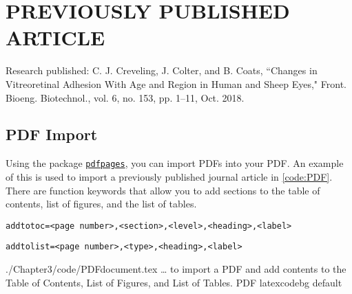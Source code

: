 \documentclass[../Dissertation]{subfiles}
\begin{document}
    \chapter[\uppercase{Previously published article}]{\uppercase{Previously
    published article}}\label{chp:3}
    
    
    Research published:  C. J. Creveling, J. Colter, and B. Coats, ``Changes in
    Vitreoretinal Adhesion With Age and Region in Human and Sheep Eyes," Front.
    Bioeng. Biotechnol., vol. 6, no. 153, pp. 1–11, Oct. 2018.
    
    
    
    \section{PDF Import}
        Using the  package
        \href{https://ctan.org/pkg/pdfpages?lang=en}{\texttt{pdfpages}}, you
        can import PDFs into your PDF.  An example of this is used to import a
        previously published journal article in \cref{code:PDF}.  There are
        function keywords that allow you to add sections to the table of
        contents, list of figures, and the list of tables.  
        
        \texttt{addtotoc={<page number>,<section>,<level>,<heading>,<label>}}
        
        \texttt{addtolist={<page number>,<type>,<heading>,<label>}}

        {./Chapter3/code/PDFdocument.tex} %
        {\ldots {} to import a PDF and add contents to the Table of
        Contents, List of Figures, and List of Tables.}
        {PDF}
        {\footnotesize}
        {latexcodebg}
        {default}

    \printbibliography[segment=\therefsegment,heading=references]
    
\end{document}
